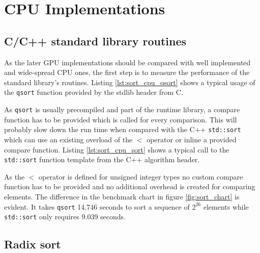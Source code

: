 \section{CPU Implementations}

\subsection{C/C++ standard library routines}

As the later GPU implementations should be compared with well implemented and wide-spread CPU ones, the first step is to measure the performance of the standard library's routines.
Listing \ref{lst:sort_cpu_qsort} shows a typical usage of the \lstinline!qsort! function provided by the stdlib header from C.



As \lstinline|qsort| is usually precompiled and part of the runtime library, a compare function has to be provided which is called for every comparison. This will probably slow down the run time when compared with the C++ \lstinline!std::sort! which can use an existing overload of the $<$ operator or inline a provided compare function.
Listing \ref{lst:sort_cpu_sort} shows a typical call to the \lstinline!std::sort! function template from the C++ algorithm header.



As the $<$ operator is defined for unsigned integer types no custom compare function has to be provided and no additional overhead is created for comparing elements.
The difference in the benchmark chart in figure \ref{fig:sort_chart} is evident. It takes \lstinline!qsort! 14.746 seconds to sort a sequence of $2^{26}$ elements while \lstinline!std::sort! only requires 9.039 seconds.

\subsection{Radix sort}
\label{sec:sorting_radix_cpu}

